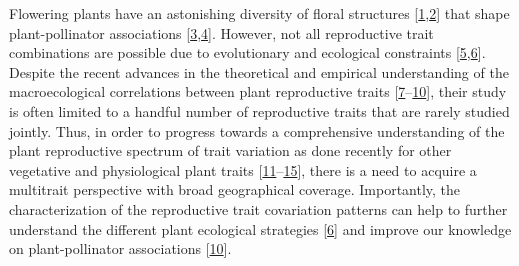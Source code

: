 \documentclass[
  12pt,
  a4paper,
]{article}
\begin{document}
Flowering plants have an astonishing diversity of floral structures {[}\protect\hyperlink{ref-barrett2002}{1},\protect\hyperlink{ref-schiestl2013}{2}{]} that shape plant-pollinator associations {[}\protect\hyperlink{ref-fenster2004}{3},\protect\hyperlink{ref-dellinger2020}{4}{]}. However, not all reproductive trait combinations are possible due to evolutionary and ecological constraints {[}\protect\hyperlink{ref-stearns1989}{5},\protect\hyperlink{ref-agrawal2020}{6}{]}. Despite the recent advances in the theoretical and empirical understanding of the macroecological correlations between plant reproductive traits {[}\protect\hyperlink{ref-salguero2016}{7}--\protect\hyperlink{ref-roddy2021}{10}{]}, their study is often limited to a handful number of reproductive traits that are rarely studied jointly. Thus, in order to progress towards a comprehensive understanding of the plant reproductive spectrum of trait variation as done recently for other vegetative and physiological plant traits {[}\protect\hyperlink{ref-wright2004}{11}--\protect\hyperlink{ref-laughlin2021}{15}{]}, there is a need to acquire a multitrait perspective with broad geographical coverage. Importantly, the characterization of the reproductive trait covariation patterns can help to further understand the different plant ecological strategies {[}\protect\hyperlink{ref-agrawal2020}{6}{]} and improve our knowledge on plant-pollinator associations {[}\protect\hyperlink{ref-roddy2021}{10}{]}.
\end{document}
